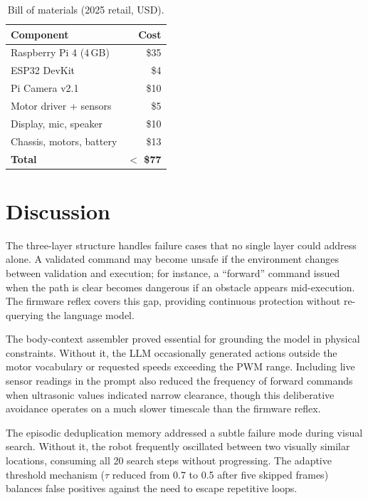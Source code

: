 \documentclass[conference]{IEEEtran}
\begin{document}
\begin{table}[t]
\caption{Bill of materials (2025 retail, USD).}
\label{tab:bom}
\centering
\renewcommand{\arraystretch}{1.05}
\begin{tabularx}{\columnwidth}{@{}YR@{}}
\toprule
\textbf{Component} & \textbf{Cost} \\
\midrule
Raspberry Pi 4 (4\,GB) & \$35 \\
ESP32 DevKit             & \$4 \\
Pi Camera v2.1           & \$10 \\
Motor driver + sensors   & \$5 \\
Display, mic, speaker    & \$10 \\
Chassis, motors, battery & \$13 \\
\midrule
\textbf{Total}           & \textbf{$<$ \$77} \\
\bottomrule
\end{tabularx}
\end{table}

\section{Discussion}
\label{sec:discussion}

The three-layer structure handles failure cases that no single layer could address alone. A validated command may become unsafe if the environment changes between validation and execution; for instance, a ``forward'' command issued when the path is clear becomes dangerous if an obstacle appears mid-execution. The firmware reflex covers this gap, providing continuous protection without re-querying the language model.

The body-context assembler proved essential for grounding the model in physical constraints. Without it, the LLM occasionally generated actions outside the motor vocabulary or requested speeds exceeding the PWM range. Including live sensor readings in the prompt also reduced the frequency of forward commands when ultrasonic values indicated narrow clearance, though this deliberative avoidance operates on a much slower timescale than the firmware reflex.

The episodic deduplication memory addressed a subtle failure mode during visual search. Without it, the robot frequently oscillated between two visually similar locations, consuming all 20 search steps without progressing. The adaptive threshold mechanism ($\tau$ reduced from 0.7 to 0.5 after five skipped frames) balances false positives against the need to escape repetitive loops.
\end{document}
